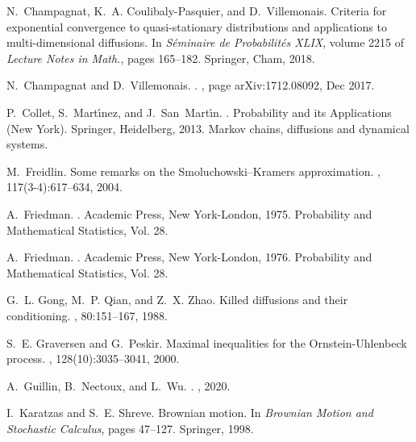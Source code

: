 \documentclass[preprint,EJP]{ejpecp}
\begin{document}
\begin{thebibliography}{10}

N.~Champagnat, K.~A. Coulibaly-Pasquier, and D.~Villemonais.
\newblock Criteria for exponential convergence to quasi-stationary
  distributions and applications to multi-dimensional diffusions.
\newblock In {\em S\'{e}minaire de {P}robabilit\'{e}s {XLIX}}, volume 2215 of
  {\em Lecture Notes in Math.}, pages 165--182. Springer, Cham, 2018.

N.~{Champagnat} and D.~{Villemonais}.
.
, page arXiv:1712.08092, Dec 2017.

P.~Collet, S.~Mart\'{\i}nez, and J.~San~Mart\'{\i}n.
.
\newblock Probability and its Applications (New York). Springer, Heidelberg,
  2013.
\newblock Markov chains, diffusions and dynamical systems.

M.~Freidlin.
\newblock Some remarks on the {S}moluchowski--{K}ramers approximation.
, 117(3-4):617--634, 2004.

A.~Friedman.
.
\newblock Academic Press, New York-London, 1975.
\newblock Probability and Mathematical Statistics, Vol. 28.

A.~Friedman.
.
\newblock Academic Press, New York-London, 1976.
\newblock Probability and Mathematical Statistics, Vol. 28.

G.~L. Gong, M.~P. Qian, and Z.~X. Zhao.
\newblock Killed diffusions and their conditioning.
, 80:151--167, 1988.

S.~E. Graversen and G.~Peskir.
\newblock Maximal inequalities for the {O}rnstein-{U}hlenbeck process.
, 128(10):3035--3041, 2000.

A.~Guillin, B.~Nectoux, and L.~Wu.
.
, 2020.

I.~Karatzas and S.~E. Shreve.
\newblock Brownian motion.
\newblock In {\em Brownian Motion and Stochastic Calculus}, pages 47--127.
  Springer, 1998.


\end{thebibliography}
\end{document}
